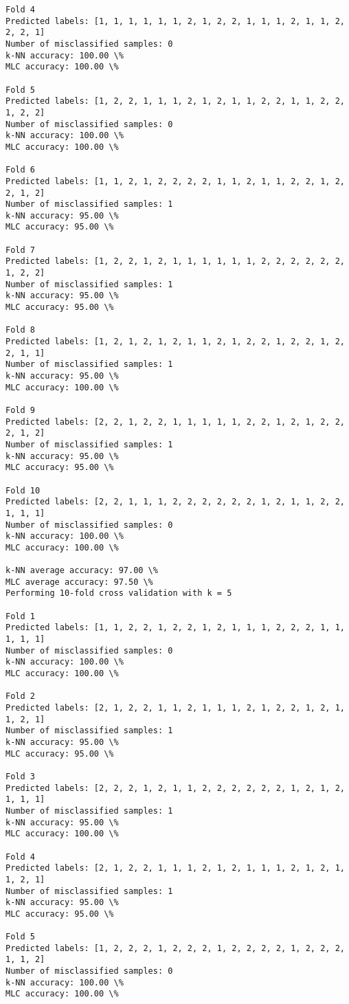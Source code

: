 \documentclass[11pt]{article}
\begin{document}
\begin{Verbatim}[commandchars=\\\{\}]
Fold 4
Predicted labels: [1, 1, 1, 1, 1, 1, 2, 1, 2, 2, 1, 1, 1, 2, 1, 1, 2, 2, 2, 1]
Number of misclassified samples: 0
k-NN accuracy: 100.00 \%
MLC accuracy: 100.00 \%

Fold 5
Predicted labels: [1, 2, 2, 1, 1, 1, 2, 1, 2, 1, 1, 2, 2, 1, 1, 2, 2, 1, 2, 2]
Number of misclassified samples: 0
k-NN accuracy: 100.00 \%
MLC accuracy: 100.00 \%

Fold 6
Predicted labels: [1, 1, 2, 1, 2, 2, 2, 2, 1, 1, 2, 1, 1, 2, 2, 1, 2, 2, 1, 2]
Number of misclassified samples: 1
k-NN accuracy: 95.00 \%
MLC accuracy: 95.00 \%

Fold 7
Predicted labels: [1, 2, 2, 1, 2, 1, 1, 1, 1, 1, 1, 2, 2, 2, 2, 2, 2, 1, 2, 2]
Number of misclassified samples: 1
k-NN accuracy: 95.00 \%
MLC accuracy: 95.00 \%

Fold 8
Predicted labels: [1, 2, 1, 2, 1, 2, 1, 1, 2, 1, 2, 2, 1, 2, 2, 1, 2, 2, 1, 1]
Number of misclassified samples: 1
k-NN accuracy: 95.00 \%
MLC accuracy: 100.00 \%

Fold 9
Predicted labels: [2, 2, 1, 2, 2, 1, 1, 1, 1, 1, 2, 2, 1, 2, 1, 2, 2, 2, 1, 2]
Number of misclassified samples: 1
k-NN accuracy: 95.00 \%
MLC accuracy: 95.00 \%

Fold 10
Predicted labels: [2, 2, 1, 1, 1, 2, 2, 2, 2, 2, 2, 1, 2, 1, 1, 2, 2, 1, 1, 1]
Number of misclassified samples: 0
k-NN accuracy: 100.00 \%
MLC accuracy: 100.00 \%

k-NN average accuracy: 97.00 \%
MLC average accuracy: 97.50 \%
Performing 10-fold cross validation with k = 5

Fold 1
Predicted labels: [1, 1, 2, 2, 1, 2, 2, 1, 2, 1, 1, 1, 2, 2, 2, 1, 1, 1, 1, 1]
Number of misclassified samples: 0
k-NN accuracy: 100.00 \%
MLC accuracy: 100.00 \%

Fold 2
Predicted labels: [2, 1, 2, 2, 1, 1, 2, 1, 1, 1, 2, 1, 2, 2, 1, 2, 1, 1, 2, 1]
Number of misclassified samples: 1
k-NN accuracy: 95.00 \%
MLC accuracy: 95.00 \%

Fold 3
Predicted labels: [2, 2, 2, 1, 2, 1, 1, 2, 2, 2, 2, 2, 2, 1, 2, 1, 2, 1, 1, 1]
Number of misclassified samples: 1
k-NN accuracy: 95.00 \%
MLC accuracy: 100.00 \%

Fold 4
Predicted labels: [2, 1, 2, 2, 1, 1, 1, 2, 1, 2, 1, 1, 1, 2, 1, 2, 1, 1, 2, 1]
Number of misclassified samples: 1
k-NN accuracy: 95.00 \%
MLC accuracy: 95.00 \%

Fold 5
Predicted labels: [1, 2, 2, 2, 1, 2, 2, 2, 1, 2, 2, 2, 2, 1, 2, 2, 2, 1, 1, 2]
Number of misclassified samples: 0
k-NN accuracy: 100.00 \%
MLC accuracy: 100.00 \%


\end{Verbatim}
\end{document}
